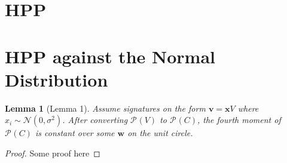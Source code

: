
\newcommand{\PP}[2][]{\mathcal{P}_{#1}(\mat{#2})}
\newcommand{\mat}[1]{\mathit{#1}}
\renewcommand{\vec}[1]{\mathbf{#1}}
\newcommand{\GLnR}{\mathcal{GL}_{n}(\mathbb{R})}
\newcommand{\normdist}[2]{\mathcal{N}(#1, #2^2)}
\newcommand{\dgdist}{\mathcal{D}_{2\bb{Z}+c, \sigma}}
\newcommand{\bb}[1]{\mathbb{#1}}

\newtheorem{lemma}{Lemma}
\newtheorem{proof}{Proof}

\section{HPP}
\section{HPP against the Normal Distribution}

\begin{lemma}[Lemma 1]
\label{hpp_norm_lemma}
Assume signatures on the form $\vec{v} = \vec{x} \mat{V}$ where $x_i \sim \normdist{0}{\sigma}$. After converting $\PP{V}$ to $\PP{C}$, the fourth moment of $\PP{C}$ is constant over some $\vec{w}$ on the unit circle.
\end{lemma}
\begin{proof}
    Some proof here
\end{proof}
